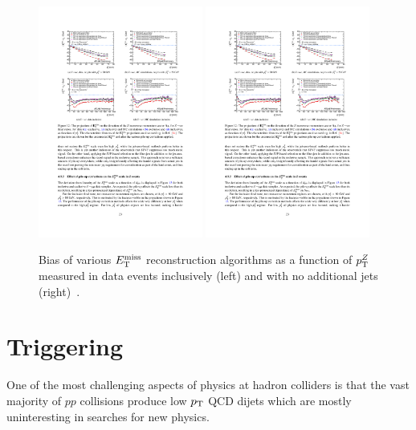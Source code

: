 \begin{figure}[tp]
  \centering
  \includegraphics[width=0.48\textwidth]{figures/performance/met-bias-inclusive}
  \includegraphics[width=0.48\textwidth]{figures/performance/met-bias-0jet}
  \caption{Bias of various $E_{\mathrm{T}}^{\mathrm{miss}}$ reconstruction algorithms as a function of $p_{\mathrm{T}}^Z$ measured in data events inclusively (left) and with no additional jets (right)~\cite{ATLAS-CONF-2014-019}.}
  \label{fig:objects-met-bias}
\end{figure}

\section{Triggering}

One of the most challenging aspects of physics at hadron colliders is that the vast majority of $pp$ collisions produce low $p_{\mathrm{T}}$ QCD dijets which are mostly uninteresting in searches for new physics.

